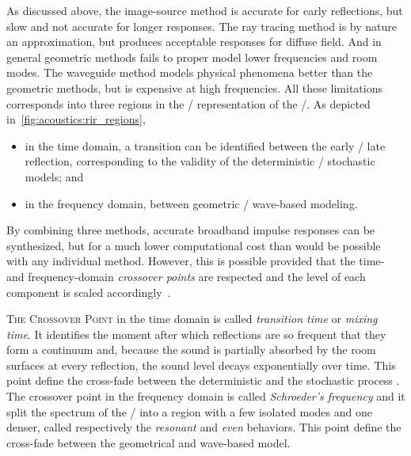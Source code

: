 As discussed above, the image-source method is accurate for early reflections, but slow and not accurate for longer responses.
The ray tracing method is by nature an approximation, but produces acceptable responses for diffuse field.
And in general geometric methods fails to proper model lower frequencies and room modes.
The waveguide method models physical phenomena better than the geometric methods, but is expensive at high frequencies.
All these limitations corresponds into three regions in the \TFdef/ representation of the \RIR/.
As depicted in~\cref{fig:acoustics:rir_regions},
\begin{itemize}
    \item in the time domain, a transition can be identified between the early \vs/ late reflection, corresponding to the validity of the deterministic \vs/ stochastic models; and
    \item in the frequency domain, between geometric \vs/ wave-based modeling.
\end{itemize}
By combining three methods, accurate broadband impulse responses can be synthesized,
but for a much lower computational cost than would be possible with any individual method.
However, this is possible provided that the time- and frequency-domain
\textit{crossover points} are respected and the level of each component is scaled accordingly~.

\textsc{The Crossover Point} in the time domain is called \textit{transition time} or \textit{mixing time}.
It identifies the moment after which reflections are so frequent that they form a continuum and,
because the sound is partially absorbed by the room surfaces at every reflection,
the sound level decays exponentially over time.
This point define the cross-fade between the deterministic and the stochastic process
.
\\The crossover point in the frequency domain is called \textit{Schroeder's frequency}
and it split the spectrum of the \RIR/ into a region with a few isolated modes and one denser,
called respectively the \textit{resonant} and \textit{even} behaviors.
This point define the cross-fade between the geometrical and wave-based model.

